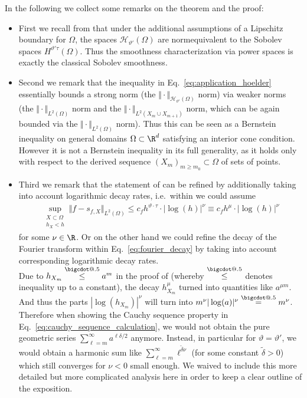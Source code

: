 \documentclass[a4paper, 10pt]{article}
\makeatletter
\newcommand*\bigcdot{\mathpalette\bigcdot@{.5}}
\newcommand*\bigcdot@[2]{\mathbin{\vcenter{\hbox{\scalebox{#2}{$\m@th#1\bullet$}}}}}
\makeatother
\begin{document}
\noindent In the following we collect some remarks on the theorem and the proof:
\begin{itemize}
\item First we recall from  that under the additional assumptions of a Lipschitz boundary for $\Omega$, 
the spaces $\mathcal{H}_{\vartheta'}(\Omega)$ are normequivalent to the Sobolev spaces $H^{\vartheta' \tau}(\Omega)$.
Thus the smoothness characterization via power spaces is exactly the classical Sobolev smoothness.
\item Second we remark that the inequality in Eq.~\eqref{eq:application_hoelder} essentially bounds a strong norm (the $\Vert \cdot \Vert_{\mathcal{H}_{\vartheta'}(\Omega)}$ norm) via weaker norms (the $\Vert \cdot \Vert_{L^2(\Omega)}$ norm and the $\Vert \cdot \Vert_{L^2(X_m \cup X_{m+1})}$ norm, which can be again bounded via the $\Vert \cdot \Vert_{L^2(\Omega)}$ norm).
Thus this can be seen as a Bernstein inequality on general domains $\Omega \subset \R^d$ satisfying an interior cone condition.
However it is not a Bernstein inequality in its full generality, 
as it holds only with respect to the derived sequence $(X_m)_{m \geq m_0} \subset \Omega$ of  sets of points.
%
%
%
%
%
%
%
%

%
%
%
%
%
%
%
%
%
%
%
%
%
%
%
%
%
%
\item Third we remark that the statement of  can be refined by additionally taking into account logarithmic decay rates, 
i.e.\ within  we could assume
\begin{align*}
\sup_{\substack{X \subset \Omega \\ h_X < h}} \Vert f - s_{f, X} \Vert_{L^2(\Omega)} \leq c_f h^{\vartheta \cdot \tau} \cdot |\log(h)|^{\nu} \equiv c_f h^{\mu} \cdot |\log(h)|^\nu
\end{align*}
for some $\nu \in \R$.
Or on the other hand we could refine the decay of the Fourier transform within Eq.~\eqref{eq:fourier_decay} by taking into account corresponding logarithmic decay rates. \\
Due to $h_{X_m} \stackrel{\bigcdot}{\leq} a^m$ in the proof of  (whereby $\stackrel{\bigcdot}{\leq}$ denotes inequality up to a constant), 
the decay $h_{X_m}^{\mu}$ turned into quantities like $a^{\mu m}$.
And thus the parts $|\log(h_{X_m})|^\nu$ will turn into $m^\nu |\log(a)|^\nu \stackrel{\bigcdot}{=} m^\nu$.
Therefore when showing the Cauchy sequence property in Eq.~\eqref{eq:cauchy_sequence_calculation}, 
we would not obtain the pure geometric series $\sum_{\ell=m}^{\infty} a^{\ell\delta/2}$ anymore.
Instead, in particular for $\vartheta = \vartheta'$, we would obtain a harmonic sum like $\sum_{\ell=m}^{\infty} \ell^{\tilde{\delta} \nu}$ (for some constant $\tilde{\delta} > 0$) which still converges for $\nu < 0$ small enough.
We waived to include this more detailed but more complicated analysis here in order to keep a clear outline of the exposition.
%
%
%

%
%
\end{itemize}
\end{document}
